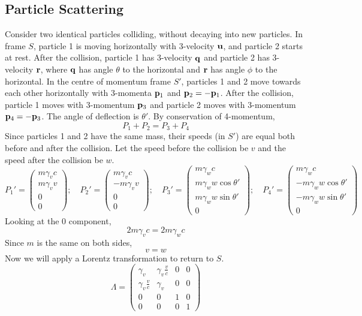 \subsection{Particle Scattering}
Consider two identical particles colliding, without decaying into new particles. In frame $S$, particle 1 is moving horizontally with 3-velocity $\vb u$, and particle 2 starts at rest. After the collision, particle 1 has 3-velocity $\vb q$ and particle 2 has 3-velocity $\vb r$, where $\vb q$ has angle $\theta$ to the horizontal and $\vb r$ has angle $\phi$ to the horizontal. In the centre of momentum frame $S'$, particles 1 and 2 move towards each other horizontally with 3-momenta $\vb p_1$ and $\vb p_2 = -\vb p_1$. After the collision, particle 1 moves with 3-momentum $\vb p_3$ and particle 2 moves with 3-momentum $\vb p_4 = -\vb p_3$. The angle of deflection is $\theta'$. By conservation of 4-momentum,
\[ P_1 + P_2 = P_3 + P_4 \]
Since particles 1 and 2 have the same mass, their speeds (in $S'$) are equal both before and after the collision. Let the speed before the collision be $v$ and the speed after the collision be $w$.
\[ P_1' = \begin{pmatrix}
		m\gamma_v c \\
		m\gamma_v v \\
		0           \\
		0
	\end{pmatrix};\quad P_2' = \begin{pmatrix}
		m\gamma_v c  \\
		-m\gamma_v v \\
		0            \\
		0
	\end{pmatrix};\quad P_3' = \begin{pmatrix}
		m\gamma_w c             \\
		m\gamma_w w \cos\theta' \\
		m\gamma_w w \sin\theta' \\
		0
	\end{pmatrix};\quad P_4' = \begin{pmatrix}
		m\gamma_w c              \\
		-m\gamma_w w \cos\theta' \\
		-m\gamma_w w \sin\theta' \\
		0
	\end{pmatrix}  \]
Looking at the 0 component,
\[ 2 m\gamma_v c = 2m\gamma_w c \]
Since $m$ is the same on both sides,
\[ v = w \]
Now we will apply a Lorentz transformation to return to $S$.
\[ \Lambda = \begin{pmatrix}
		\gamma_v             & \gamma_v \frac{v}{c} & 0 & 0 \\
		\gamma_v \frac{v}{c} & \gamma_v             & 0 & 0 \\
		0                    & 0                    & 1 & 0 \\
		0                    & 0                    & 0 & 1
	\end{pmatrix} \]
